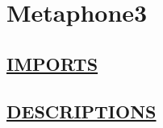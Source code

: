 \chapter*{Metaphone3}
\hypertarget{ecldoc:toc:Metaphone3}{}

\section*{\underline{IMPORTS}}

\section*{\underline{DESCRIPTIONS}}
